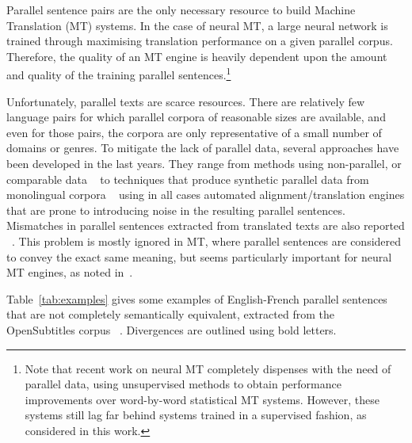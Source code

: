 \documentclass[11pt,a4paper]{article}
\begin{document}
Parallel sentence pairs are the only necessary resource to build Machine Translation (MT) systems.
In the case of neural MT, a large neural network is trained through maximising translation performance on a given parallel corpus. 
Therefore, the quality of an MT engine is heavily dependent upon the
amount and quality of the training parallel sentences.\footnote{Note
  that  recent work on neural MT
  \cite{lample2018word,artetxe2018iclr} completely dispenses with the
  need of parallel data, using unsupervised methods to obtain performance
  improvements over word-by-word statistical MT systems. However, these systems
  still lag far behind systems trained in a supervised fashion, as
  considered in this work.} 

Unfortunately, parallel texts are scarce resources. 
There are relatively few language pairs for which parallel corpora of
reasonable sizes are available, and even for those pairs, the corpora
are only representative of a small number of domains or genres. 
To mitigate the lack of parallel data, several approaches have been developed in the last years.
They range from methods using non-parallel, or comparable data ~\cite{Zhao:2002:APS:844380.844785,W04-3208,J05-4003,W17-2509,P17-3003,P18-2037} to techniques that produce synthetic parallel data from monolingual corpora ~\cite{P16-1009,W17-4714} using in all cases automated alignment/translation engines that are prone to introducing noise in the resulting parallel sentences. 
Mismatches in parallel sentences extracted from translated texts are also reported ~\cite{tiedemann2011bitext,XU16.310}. 
This problem is mostly ignored in MT, where parallel sentences are considered to convey the exact same meaning, but seems particularly important for neural MT engines, as noted in~\citet{chen2016adaptation}.

Table~\ref{tab:examples} gives some examples of English-French
parallel sentences that are not completely semantically equivalent, 
extracted from the OpenSubtitles corpus ~\cite{LisonTiedemann2016}. 
Divergences are outlined using bold letters. 
\end{document}

